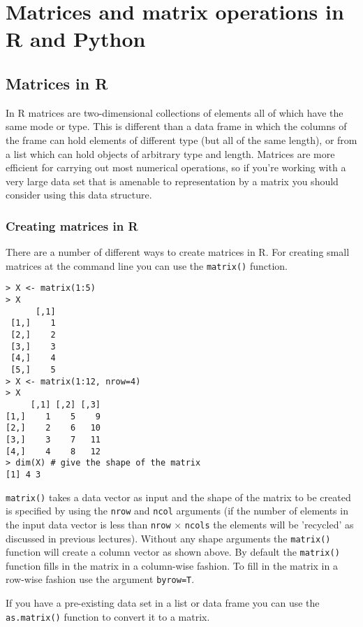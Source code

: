 \documentclass{article}
\begin{document}
\section{Matrices and matrix operations in R and Python}

\subsection{Matrices in R}

In R matrices are two-dimensional collections of elements all of which
have the same mode or type. This is different than a data frame in which
the columns of the frame can hold elements of different type (but all of
the same length), or from a list which can hold objects of arbitrary
type and length. Matrices are more efficient for carrying out most
numerical operations, so if you're working with a very large data set
that is amenable to representation by a matrix you should consider using
this data structure.

\subsubsection{Creating matrices in R}

There are a number of different ways to create matrices in R. For
creating small matrices at the command line you can use the
\lstinline!matrix()! function.

\begin{lstlisting}
> X <- matrix(1:5)
> X
      [,1]
 [1,]    1
 [2,]    2
 [3,]    3
 [4,]    4
 [5,]    5
> X <- matrix(1:12, nrow=4)
> X
     [,1] [,2] [,3]
[1,]    1    5    9
[2,]    2    6   10
[3,]    3    7   11
[4,]    4    8   12
> dim(X) # give the shape of the matrix 
[1] 4 3
\end{lstlisting}
\lstinline!matrix()! takes a data vector as input and the shape of the
matrix to be created is specified by using the \lstinline!nrow! and
\lstinline!ncol! arguments (if the number of elements in the input data
vector is less than \lstinline!nrow! $\times$ \lstinline!ncols! the
elements will be 'recycled' as discussed in previous lectures). Without
any shape arguments the \lstinline!matrix()! function will create a
column vector as shown above. By default the \lstinline!matrix()!
function fills in the matrix in a column-wise fashion. To fill in the
matrix in a row-wise fashion use the argument \lstinline!byrow=T!.

If you have a pre-existing data set in a list or data frame you can use
the \lstinline!as.matrix()! function to convert it to a matrix.
\end{document}
